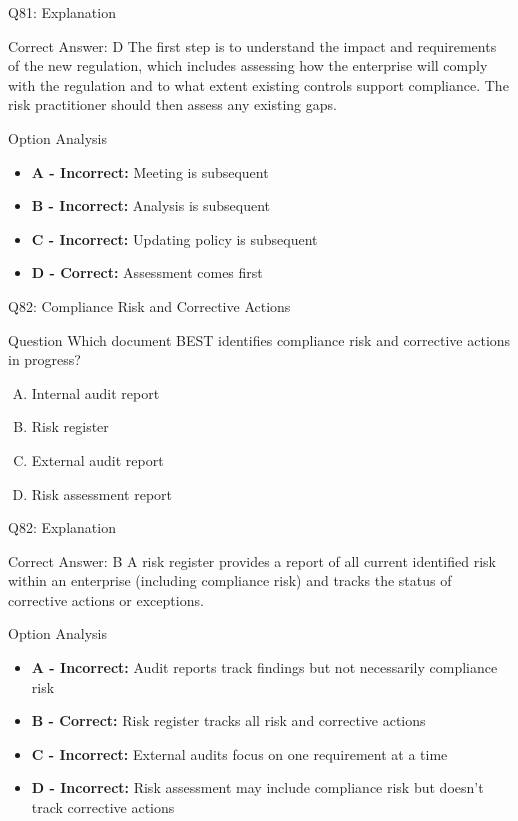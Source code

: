 \documentclass{beamer}
\begin{document}
	\begin{frame}{Q81: Explanation}
		\begin{block}{Correct Answer: D}
			The first step is to understand the impact and requirements of the new regulation, which includes assessing how the enterprise will comply with the regulation and to what extent existing controls support compliance. The risk practitioner should then assess any existing gaps.
		\end{block}
		\begin{block}{Option Analysis}
			\begin{itemize}
				\item \textbf{A - Incorrect:} Meeting is subsequent
				\item \textbf{B - Incorrect:} Analysis is subsequent
				\item \textbf{C - Incorrect:} Updating policy is subsequent
				\item \textbf{D - Correct:} Assessment comes first
			\end{itemize}
		\end{block}
	\end{frame}
	
	\begin{frame}{Q82: Compliance Risk and Corrective Actions}
		\begin{block}{Question}
			Which document BEST identifies compliance risk and corrective actions in progress?
		\end{block}
		\begin{enumerate}[(A)]
			\item Internal audit report
			\item Risk register
			\item External audit report
			\item Risk assessment report
		\end{enumerate}
	\end{frame}
	
	\begin{frame}{Q82: Explanation}
		\begin{block}{Correct Answer: B}
			A risk register provides a report of all current identified risk within an enterprise (including compliance risk) and tracks the status of corrective actions or exceptions.
		\end{block}
		\begin{block}{Option Analysis}
			\begin{itemize}
				\item \textbf{A - Incorrect:} Audit reports track findings but not necessarily compliance risk
				\item \textbf{B - Correct:} Risk register tracks all risk and corrective actions
				\item \textbf{C - Incorrect:} External audits focus on one requirement at a time
				\item \textbf{D - Incorrect:} Risk assessment may include compliance risk but doesn't track corrective actions
			\end{itemize}
		\end{block}
	\end{frame}
	
\end{document}
